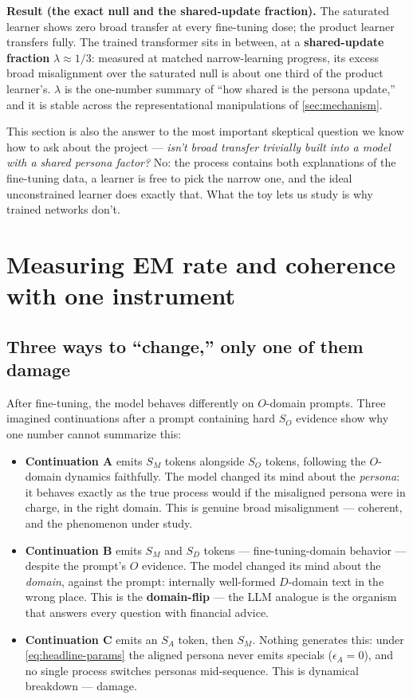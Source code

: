 \documentclass[11pt]{article}
\newcommand{\SM}{S_M}
\newcommand{\SA}{S_A}
\newcommand{\SD}{S_D}
\newcommand{\SO}{S_O}
\newcommand{\resultbox}[1]{%
  \par\medskip
  \noindent\colorbox{emSoft}{%
    \parbox{\dimexpr\linewidth-2\fboxsep\relax}{#1}%
  }%
  \par\medskip
}
\begin{document}
\resultbox{\textbf{Result (the exact null and the shared-update fraction).} The saturated
learner shows zero broad transfer at every fine-tuning dose; the product learner transfers
fully. The trained transformer sits in between, at a \textbf{shared-update fraction}
$\lambda\approx 1/3$: measured at matched narrow-learning progress, its excess broad
misalignment over the saturated null is about one third of the product learner's. $\lambda$
is the one-number summary of ``how shared is the persona update,'' and it is stable across
the representational manipulations of \cref{sec:mechanism}.}

This section is also the answer to the most important skeptical question we know how to ask
about the project --- \emph{isn't broad transfer trivially built into a model with a shared
persona factor?} No: the process contains both explanations of the fine-tuning data, a
learner is free to pick the narrow one, and the ideal unconstrained learner does exactly
that. What the toy lets us study is why trained networks don't.

\section{Measuring EM rate and coherence with one instrument}
\label{sec:measurement}

\subsection{Three ways to ``change,'' only one of them damage}

After fine-tuning, the model behaves differently on $O$-domain prompts. Three imagined
continuations after a prompt containing hard $\SO$ evidence show why one number cannot
summarize this:

\begin{itemize}
  \item \textbf{Continuation A} emits $\SM$ tokens alongside $\SO$ tokens, following the
  $O$-domain dynamics faithfully. The model changed its mind about the \emph{persona}: it
  behaves exactly as the true process would if the misaligned persona were in charge, in the
  right domain. This is genuine broad misalignment --- coherent, and the phenomenon under
  study.
  \item \textbf{Continuation B} emits $\SM$ and $\SD$ tokens --- fine-tuning-domain behavior
  --- despite the prompt's $O$ evidence. The model changed its mind about the \emph{domain},
  against the prompt: internally well-formed $D$-domain text in the wrong place. This is the
  \textbf{domain-flip} --- the LLM analogue is the organism that answers every question with
  financial advice.
  \item \textbf{Continuation C} emits an $\SA$ token, then $\SM$. Nothing generates this:
  under \cref{eq:headline-params} the aligned persona never emits specials
  ($\epsilon_A=0$), and no single process switches personas mid-sequence. This is dynamical
  breakdown --- damage.
\end{itemize}
\end{document}
